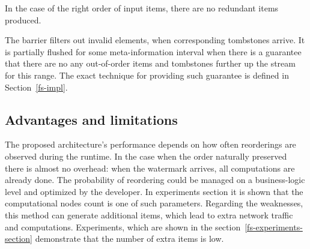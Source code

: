 In the case of the right order of input items, there are no redundant items produced.

The barrier filters out invalid elements, when corresponding tombstones arrive. It is partially flushed for some meta-information interval when there is a guarantee that there are no any out-of-order items and tombstones further up the stream for this range. The exact technique for providing such guarantee is defined in Section~\ref{fs-impl}.

\subsection{Advantages and limitations}

The proposed architecture's performance depends on how often reorderings are observed during the runtime. In the case when the order naturally preserved there is almost no overhead: when the watermark arrives, all computations are already done. The probability of reordering could be managed on a business-logic level and optimized by the developer. In experiments section it is shown that the computational nodes count is one of such parameters. Regarding the weaknesses, this method can generate additional items, which lead to extra network traffic and computations. Experiments, which are shown in the section~\ref{fs-experiments-section} demonstrate that the number of extra items is low.

